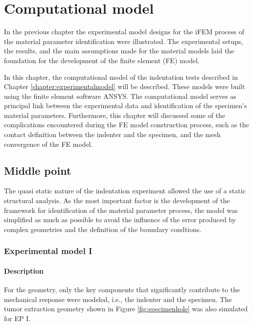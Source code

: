 
\chapter{Computational model} %
\label{chapter:computationalmodel} %

In the previous chapter the experimental model designs for the iFEM process of the material 
parameter identification were illustrated. The experimental setups, the results, and the main assumptions 
made for the material models laid the foundation for the development of the finite element (FE) model.

In this chapter, the computational model of the indentation tests described in Chapter \ref{chapter:experimentalmodel} 
will be described. These models were built using the finite element software ANSYS. 
The computational model serves as principal link between the experimental data and identification of the 
specimen's material parameters. Furthermore, this chapter will discussed some of the complications encountered 
during the FE model construction process, such as the contact definition between the indenter and the specimen,
and the mesh convergence of the FE model.

\section{Middle point}
The quasi static nature of the indentation experiment allowed the use of a static 
structural analysis. As the most important factor is the development of the framework for identification 
of the material parameter process, the model was simplified as much as possible to avoid the influence 
of the error produced by complex geometries and the definition of the boundary condtions.\\

\subsection{Experimental model I}
\subsubsection*{Description}

For the geometry, only the key components that significantly contribute to the mechanical response were modeled, 
i.e., the indenter and the specimen. The tumor extraction geometry shown in Figure \ref{fig:specimenhole}
was also simulated for EP I. 

